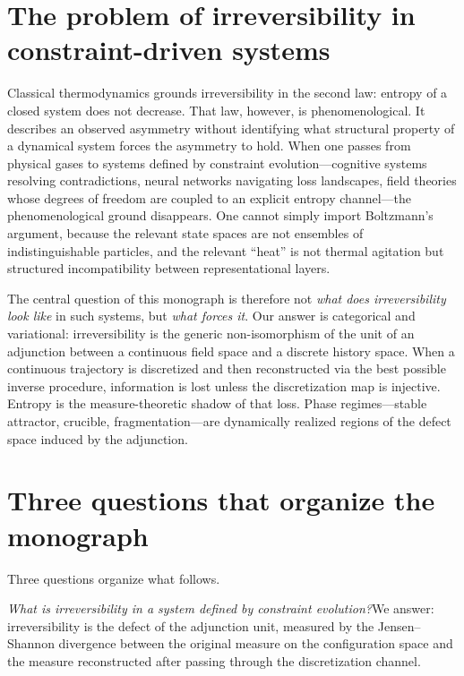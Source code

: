 \documentclass[12pt, oneside]{memoir}
\begin{document}
\section{The problem of irreversibility in constraint-driven systems}

Classical thermodynamics grounds irreversibility in the second law: entropy of a closed
system does not decrease.  That law, however, is phenomenological.  It describes an
observed asymmetry without identifying what structural property of a dynamical system
forces the asymmetry to hold.  When one passes from physical gases to systems defined by
constraint evolution---cognitive systems resolving contradictions, neural networks
navigating loss landscapes, field theories whose degrees of freedom are coupled to an
explicit entropy channel---the phenomenological ground disappears.  One cannot simply
import Boltzmann's argument, because the relevant state spaces are not ensembles of
indistinguishable particles, and the relevant ``heat'' is not thermal agitation but
structured incompatibility between representational layers.

The central question of this monograph is therefore not \emph{what does irreversibility
look like} in such systems, but \emph{what forces it}.  Our answer is categorical and
variational: irreversibility is the generic non-isomorphism of the unit of an adjunction
between a continuous field space and a discrete history space.  When a continuous
trajectory is discretized and then reconstructed via the best possible inverse procedure,
information is lost unless the discretization map is injective.  Entropy is the
measure-theoretic shadow of that loss.  Phase regimes---stable attractor, crucible,
fragmentation---are dynamically realized regions of the defect space induced by the
adjunction.

\section{Three questions that organize the monograph}

Three questions organize what follows.

\medskip\noindent\textit{What is irreversibility in a system defined by constraint
evolution?}\enspace We answer: irreversibility is the defect of the adjunction unit,
measured by the Jensen--Shannon divergence between the original measure on the
configuration space and the measure reconstructed after passing through the discretization
channel.
\end{document}
